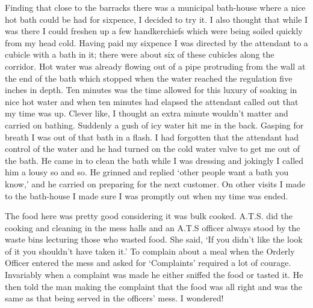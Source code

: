 Finding that close to the barracks there was a municipal bath-house
where a nice hot bath could be had for sixpence, I decided to try it.
I also thought that while I was there I could freshen up a few
handkerchiefs which were being soiled quickly from my head cold.
Having paid my sixpence I was directed by the attendant to a cubicle
with a bath in it; there were about six of these cubicles along the
corridor. Hot water was already flowing out of a pipe protruding from
the wall at the end of the bath which stopped when the water reached
the regulation five inches in depth. Ten minutes was the time allowed
for this luxury of soaking in nice hot water and when ten minutes had
elapsed the attendant called out that my time was up. Clever like, I
thought an extra minute wouldn't matter and carried on bathing.
Suddenly a gush of icy water hit me in the back. Gasping for breath I
was out of that bath in a flash. I had forgotten that the attendant
had control of the water and he had turned on the cold water valve to
get me out of the bath. He came in to clean the bath while I was
dressing and jokingly I called him a lousy so and so. He grinned and
replied `other people want a bath you know,' and he carried on
preparing for the next customer. On other visits I made to the
bath-house I made sure I was promptly out when my time was ended.

The food here was pretty good considering it was bulk cooked.
A.T.S. did the cooking and cleaning in the mess halls and an A.T.S
officer always stood by the waste bins lecturing those who wasted
food. She said, `If you didn't like the look of it you shouldn't have
taken it.'  To complain about a meal when the Orderly Officer entered
the mess and asked for `Complaints' required a lot of courage.
Invariably when a complaint was made he either sniffed the food or
tasted it. He then told the man making the complaint that the food
was all right and was the same as that being served in the officers'
mess. I wondered!

